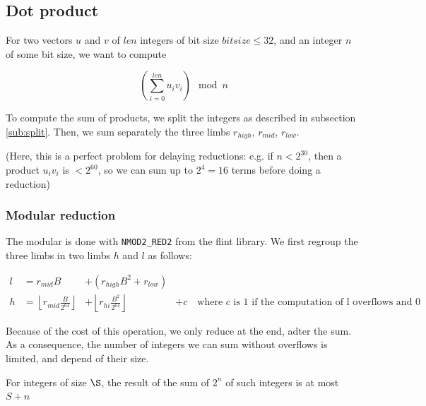 \documentclass[a4paper]{article}
\begin{document}
\subsection{Dot product}

For two vectors $u$ and $v$ of $len$ integers of bit size $bitsize \le 32$, and an integer $n$ of some bit size, we want to compute

\[\left(\sum_{i=0}^{len}u_iv_i\right) \mod n\]

To compute the sum of products, we split the integers as described in subsection \ref{sub:split}. Then, we sum separately the three limbs $r_{high}$, $r_{mid}$, $r_{low}$. %

(Here, this is a perfect problem for delaying reductions: e.g. if \(n < 2^{30}\), then a product \(u_iv_i\) is \(< 2^{60}\), so we can sum up to \(2^4 = 16\) terms before doing a reduction)

\subsubsection{Modular reduction}

The modular is done with \texttt{NMOD2\_RED2} from the flint library. We first regroup the three limbs in two limbs $h$ and $l$ as follows:

\begin{align}
    l &= r_{mid}B &+ \left(r_{high}B^2 + r_{low}\right) \\
    h &= \left\lfloor r_{mid}\frac{B}{2^{64}}\right\rfloor &+ \left\lfloor r_{hi}\frac{B^2}{2^{64}}\right\rfloor &+ c \quad{\text{where $c$ is $1$ if the computation of l overflows and 0 otherwise}}
\end{align}

Because of the cost of this operation, we only reduce at the end, adter the sum. As a consequence, the number of integers we can sum without overflows is limited, and depend of their size.

\begin{proposition}\label{prop:sum}
    For integers of size $\S$, the result of the sum of $2^n$ of such integers is at most $S + n$
\end{proposition}
\end{document}
